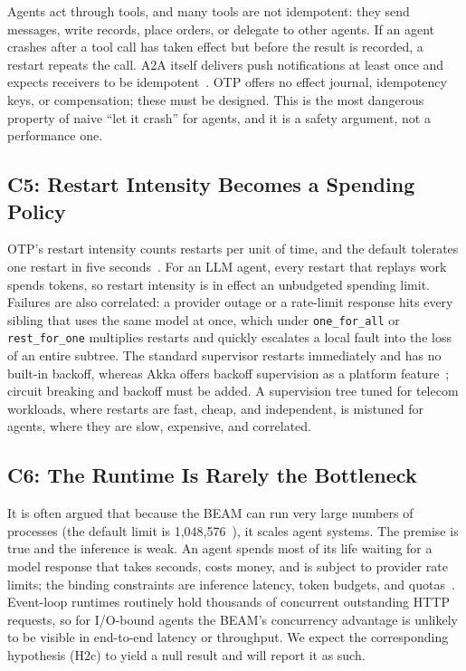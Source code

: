 \documentclass[conference,letterpaper]{IEEEtran}
\newcommand{\code}[1]{\texttt{#1}}
\begin{document}
Agents act through tools, and many tools are not idempotent: they send
messages, write records, place orders, or delegate to other agents. If an
agent crashes after a tool call has taken effect but before the result is
recorded, a restart repeats the call. A2A itself delivers push notifications
at least once and expects receivers to be idempotent~\cite{aaif2026}. OTP
offers no effect journal, idempotency keys, or compensation; these must be
designed. This is the most dangerous property of naive ``let it crash'' for
agents, and it is a safety argument, not a performance one.

\subsection{C5: Restart Intensity Becomes a Spending Policy}

OTP's restart intensity counts restarts per unit of time, and the default
tolerates one restart in five seconds~\cite{otp-sup}. For an LLM agent,
every restart that replays work spends tokens, so restart intensity is in
effect an unbudgeted spending limit. Failures are also correlated: a
provider outage or a rate-limit response hits every sibling that uses the
same model at once, which under \code{one\_for\_all} or
\code{rest\_for\_one} multiplies restarts and quickly escalates a local fault
into the loss of an entire subtree. The standard supervisor restarts
immediately and has no built-in backoff, whereas Akka offers backoff
supervision as a platform feature~\cite{akka-capabilities}; circuit breaking
and backoff must be added. A supervision tree tuned for telecom workloads,
where restarts are fast, cheap, and independent, is mistuned for agents,
where they are slow, expensive, and correlated.

\subsection{C6: The Runtime Is Rarely the Bottleneck}

It is often argued that because the BEAM can run very large numbers of
processes (the default limit is 1{,}048{,}576~\cite{otp-limits}), it scales
agent systems. The premise is true and the inference is weak. An agent
spends most of its life waiting for a model response that takes seconds,
costs money, and is subject to provider rate limits; the binding constraints
are inference latency, token budgets, and quotas~\cite{anthropic2025}.
Event-loop runtimes routinely hold thousands of concurrent outstanding HTTP
requests, so for I/O-bound agents the BEAM's concurrency advantage is
unlikely to be visible in end-to-end latency or throughput. We expect the
corresponding hypothesis (H2c) to yield a null result and will report it as
such.
\end{document}
